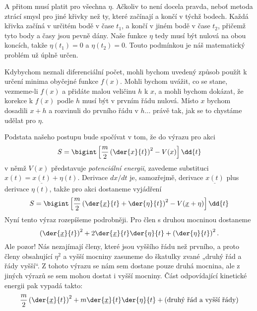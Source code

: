     A přitom musí platit pro všechna \(\eta\). Ačkoliv to není docela pravda, neboť metoda ztrácí
    smysl pro jiné křivky než ty, které začínají a končí v týchž bodech. Každá křivka začíná v
    určitém bodě v čase \(t_1\), a končí v jiném bodě v čase \(t_2\), přičemž tyto body a časy jsou
    pevně dány. Naše funkce \(\eta\) tedy musí být nulová na obou koncích, takže \(\eta(t_1)=0\) a
    \(\eta(t_2)=0\). Touto podmínkou je náš matematický problém už úplně určen.

    Kdybychom neznali diferenciální počet, mohli bychom uvedený způsob použít k určení minima
    obyčejné funkce \(f(x)\). Mohli bychom uvážit, co se stane, vezmeme-li \(f(x)\) a přidáte malou
    veličinu \(h\) k \(x\), a mohli bychom dokázat, že korekce k \(f(x)\) podle \(h\) musí být v
    prvním řádu nulová. Místo \(x\) bychom dosadili \(x+h\) a rozvinuli do prvního řádu v
    \(h\ldots\) právě tak, jak se to chystáme udělat pro \(\eta\).

    Podstata našeho postupu bude spočívat v tom, že do výrazu pro akci
    \begin{equation*}
      S = \bigint\left[\frac{m}{2}\left(\der{x}{t}\right)^2 - V(x) \right]\dd{t}
    \end{equation*}
    v němž \(V(x)\) představuje \emph{potenciální energii}, zavedeme substituci \(x(t) =
    \underline{x(t)}+\eta(t)\). Derivace \(dx/dt\) je, samozřejmě, derivace \(\underline{x(t)}\)
    plus derivace \(\eta(t)\), takže pro akci dostaneme vyjádření
    \begin{equation*}
      S = \bigint\left[\frac{m}{2}\left(\der{\underline{x}}{t}+\der{\eta}{t}\right)^2 
          - V(\underline{x}+\eta)\right]\dd{t}
    \end{equation*}
    Nyní tento výraz rozepíšeme podrobněji. Pro člen s druhou mocninou dostaneme
    \begin{equation*}
      \left(\der{\underline{x}}{t}\right)^2 + 2\der{\underline{x}}{t}\der{\eta}{t} 
      + \left(\der{\eta}{t}\right)^2.
    \end{equation*}
    Ale pozor! Nás nezajímají členy, které jsou vyššího řádu než prvního, a proto členy obsahující
    \(\eta^2\) a vyšší mocniny zasuneme do škatulky zvané „druhý řád a řády vyšší“. Z tohoto výrazu
    se nám sem dostane pouze druhá mocnina, ale z jiných výrazů se sem mohou dostat i vyšší mocniny.
    Část odpovídající kinetické energii pak vypadá takto:
    \begin{equation*}
      \dfrac{m}{2}\left(\der{\underline{x}}{t}\right)^2 + m\der{\underline{x}}{t}\der{\eta}{t} + 
      (\text{druhý řád a vyšší řády})
    \end{equation*}

